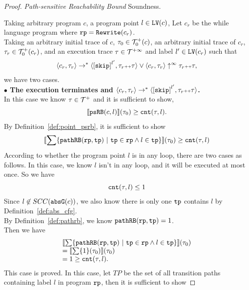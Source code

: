 \begin{proof} \emph{Path-sensitive Reachability Bound} Soundness.

    Taking arbitrary program $c$, a program point $l \in \mathtt{LV}(c)$,
    Let $c_r$ be the while language program where $\mathtt{rp} = \mathtt{Rewrite}(c_r)$.
    \\
    Taking an arbitrary initial trace of $c$, $\mathtt{\tau}_0 \in \mathcal{T}^{+}_0(c)$, an arbitrary initial trace of $c_r$, $\mathtt{\tau}_r \in \mathcal{T}^{+}_0(c_r)$, and an execution trace $\mathtt{\tau} \in \mathcal{T}^{+\infty}$ and label $l' \in \mathtt{LV}(c_r)$
   such that 
   \[
    \config{{c_r}, \trace_r} \to^{*} \config{\clabel{\eskip}^{l'}, \trace_r \tracecat \trace} \lor \config{c_r, \trace_r} \uparrow^{\infty} \trace_r \tracecat \trace,
    \]
   we have two cases.
  \\
  \textbf{$\bullet$ The execution terminates and {$\config{{c_r}, \trace_r} \to^{*} \config{\clabel{\eskip}^{l'}, \trace_r \tracecat \trace}$}.} 
  \\
  In this case we know $\mathtt{\tau} \in \mathcal{T}^{+}$ and it is sufficient to show,
    \[
    \llbracket \mathtt{psRB}(c, l) \rrbracket(\mathtt{\tau}_0) \geq \mathtt{cnt}(\mathtt{\tau}, l) .
    \]
    By Definition~\ref{def:point_psrb}, it is sufficient to show 
    \[
    \econfig{
        \sum \left\{ \inoutB(\rprog, \tpath) ~\vert~ \tpath \in \rprog \land l \in \tpath \right\}
        }(\trace_0)  \geq  \counter(\trace, l)
    \]
    According to whether the program point $l$ is in any loop, there are two cases as follows.
    In this case, we know $l$ isn't in any loop, and it will be executed at most once. So we have
    \[ 
        \mathtt{cnt}(\mathtt{\tau}, l) \leq 1
    \]
    Since $l \not\in SCC(\mathtt{abs}{\mathtt{G}}(c))$, we also know there is only one $\mathtt{tp}$ contains $l$ by Definition~\ref{def:abs_cfg}.
    \\
    By Definition~\ref{def:pathrb}, we know $\mathtt{pathRB}(\mathtt{rp}, \mathtt{tp}) = 1$.
    \\
    Then we have 
    \[
        \begin{array}{l}
        \econfig{
        \sum \left\{ \inoutB(\rprog, \tpath) ~\vert~ \tpath \in \rprog \land l \in \tpath \right\}
        }(\trace_0)
        \\ =  \econfig{ \sum \left\{ 1 \right\}(\trace_0)}(\trace_0)
        \\ =  1 \geq \counter(\trace, l).
        \end{array}
        \]
    This case is proved.
    In this case, let $TP$ be the set of all transition paths containing 
    label $l$ in program $\mathtt{rp}$, then it is sufficient to show 

\end{proof}
